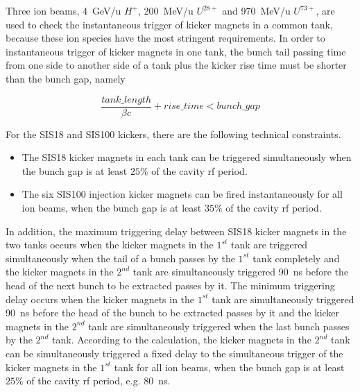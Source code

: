 Three ion beams, \SI{4}{GeV/u} $H^+$, \SI{200}{MeV/u} $U^{28+}$ and \SI{970}{MeV/u} $U^{73+}$, are used to check the instantaneous trigger of kicker magnets in a common tank, because these ion species have the most stringent requirements. In order to instantaneous trigger of kicker magnets in one tank, the bunch tail passing time from one side to another side of a tank plus the kicker rise time must be shorter than the bunch gap, namely

\begin{equation}
		\frac{tank\_length}{\beta c}+rise\_time<bunch\_gap
\end{equation}

For the SIS18 and SIS100 kickers, there are the following technical constraints.
\begin{itemize}
	\item The SIS18 kicker magnets in each tank can be triggered simultaneously when the bunch gap is at least $25\%$ of the cavity rf period. 

	\item The six SIS100 injection kicker magnets can be fired instantaneously for all ion beams, when the bunch gap is at least $35\%$ of the cavity rf period.
\end{itemize}

In addition, the maximum triggering delay between SIS18 kicker magnets in the two tanks occurs when the kicker magnets in the $1^{st}$ tank are triggered simultaneously when the tail of a bunch passes by the $1^{st}$ tank completely and the kicker
magnets in the $2^{nd}$ tank are simultaneously triggered \SI{90}{ns} before the head of the next bunch to be extracted passes by it. The minimum triggering delay occurs when the kicker magnets in the $1^{st}$ tank are simultaneously triggered \SI{90}{ns} before the head of the bunch to be extracted passes by it and the kicker magnets in the $2^{nd}$ tank are simultaneously triggered when the last bunch passes by the $2^{nd}$ tank. According to the calculation, the kicker magnets in the $2^{nd}$ tank can be simultaneously triggered a fixed delay to the simultaneous trigger of the kicker magnets in the $1^{st}$ tank for all ion beams, when the bunch gap is at least $25\%$ of the cavity rf period, e.g. \SI{80}{\ns}.
